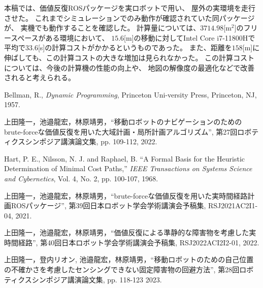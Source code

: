 \documentclass{jarticle}
\begin{document}
本稿では、価値反復ROSパッケージを実ロボットで用い、
屋外の実環境を走行させた。
これまでシミュレーションでのみ動作が確認されていた同パッケージが、
実機でも動作することを確認した。
計算量については、$3714.98$[m$^2$]のフリースペースがある環境において、
$15.6$[m]の移動に対してIntel Core i7-11800Hで
平均で$33.6$[s]の計算コストがかかるというものであった。
また、距離を$158$[m]に伸ばしても、この計算コストの大きな増加は見られなかった。
この計算コストについては、今後の計算機の性能の向上や、
地図の解像度の最適化などで改善されると考えられる。

\footnotesize
\begin{thebibliography}{99}

	Bellman, R., {\it Dynamic Programming}, Princeton Uni-versity Press, Princeton, NJ, 1957.

	上田隆一，池邉龍宏，林原靖男，``移動ロボットのナビゲーションのためのbrute-forceな価値反復を用いた大域計画・局所計画アルゴリズム'', 
	第27回ロボティクスシンポジア講演論文集, pp. 109-112, 2022.
	
	Hart, P. E., Nilsson, N. J. and Raphael, B. ``A Formal
	Basis for the Heuristic Determination of Minimal Cost
	Paths,'' {\it IEEE Transactions on Systems Science and Cybernetics}, Vol. 4, No. 2, pp. 100-107, 1968.
	
	上田隆一，池邉龍宏，林原靖男，``brute-forceな価値反復を用いた実時間経路計画ROSパッケージ'', 
	第39回日本ロボット学会学術講演会予稿集, RSJ2021AC2I1-04, 2021.

	上田隆一，池邉龍宏，林原靖男，``価値反復による準静的な障害物を考慮した実時間経路'', 
	第40回日本ロボット学会学術講演会予稿集, RSJ2022ACI2I2-01, 2022.

	上田隆一，登内リオン, 池邉龍宏，林原靖男，``移動ロボットのための自己位置の不確かさを考慮したセンシングできない固定障害物の回避方法'', 
	第28回ロボティクスシンポジア講演論文集, pp. 118-123 2023.

\end{thebibliography}

\normalsize
\end{document}
